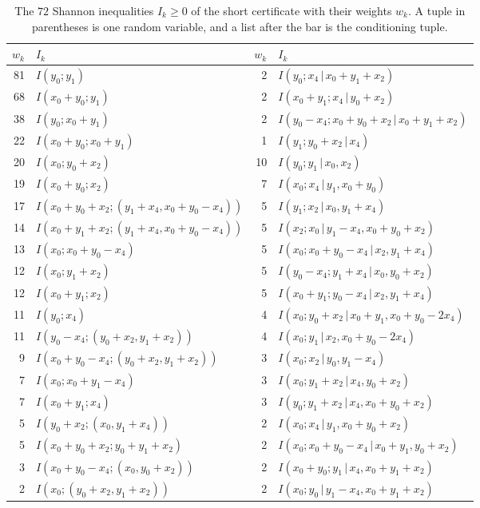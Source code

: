 \documentclass[11pt]{amsart}
\theoremstyle{definition}
\theoremstyle{remark}
\numberwithin{equation}{section}
\begin{document}
\begin{table}[p]
\centering
\caption{The $72$ Shannon inequalities $I_k\ge0$ of the short certificate with their weights $w_k$. A tuple in parentheses is one random variable, and a list after the bar is the conditioning tuple.}\label{tab:shortrows}
\small
\begin{tabular}{@{}rl@{\quad}rl@{}}
\toprule
$w_k$ & $I_k$ & $w_k$ & $I_k$\\
\midrule
81 & $I(y_0;y_1)$ & 2 & $I(y_0;x_4\,|\,x_0+y_1+x_2)$ \\
68 & $I(x_0+y_0;y_1)$ & 2 & $I(x_0+y_1;x_4\,|\,y_0+x_2)$ \\
38 & $I(y_0;x_0+y_1)$ & 2 & $I(y_0-x_4;x_0+y_0+x_2\,|\,x_0+y_1+x_2)$ \\
22 & $I(x_0+y_0;x_0+y_1)$ & 1 & $I(y_1;y_0+x_2\,|\,x_4)$ \\
20 & $I(x_0;y_0+x_2)$ & 10 & $I(y_0;y_1\,|\,x_0, x_2)$ \\
19 & $I(x_0+y_0;x_2)$ & 7 & $I(x_0;x_4\,|\,y_1, x_0+y_0)$ \\
17 & $I(x_0+y_0+x_2;(y_1+x_4, x_0+y_0-x_4))$ & 5 & $I(y_1;x_2\,|\,x_0, y_1+x_4)$ \\
14 & $I(x_0+y_1+x_2;(y_1+x_4, x_0+y_0-x_4))$ & 5 & $I(x_2;x_0\,|\,y_1-x_4, x_0+y_0+x_2)$ \\
13 & $I(x_0;x_0+y_0-x_4)$ & 5 & $I(x_0;x_0+y_0-x_4\,|\,x_2, y_1+x_4)$ \\
12 & $I(x_0;y_1+x_2)$ & 5 & $I(y_0-x_4;y_1+x_4\,|\,x_0, y_0+x_2)$ \\
12 & $I(x_0+y_1;x_2)$ & 5 & $I(x_0+y_1;y_0-x_4\,|\,x_2, y_1+x_4)$ \\
11 & $I(y_0;x_4)$ & 4 & $I(x_0;y_0+x_2\,|\,x_0+y_1, x_0+y_0-2x_4)$ \\
11 & $I(y_0-x_4;(y_0+x_2, y_1+x_2))$ & 4 & $I(x_0;y_1\,|\,x_2, x_0+y_0-2x_4)$ \\
9 & $I(x_0+y_0-x_4;(y_0+x_2, y_1+x_2))$ & 3 & $I(x_0;x_2\,|\,y_0, y_1-x_4)$ \\
7 & $I(x_0;x_0+y_1-x_4)$ & 3 & $I(x_0;y_1+x_2\,|\,x_4, y_0+x_2)$ \\
7 & $I(x_0+y_1;x_4)$ & 3 & $I(y_0;y_1+x_2\,|\,x_4, x_0+y_0+x_2)$ \\
5 & $I(y_0+x_2;(x_0, y_1+x_4))$ & 2 & $I(x_0;x_4\,|\,y_1, x_0+y_0+x_2)$ \\
5 & $I(x_0+y_0+x_2;y_0+y_1+x_2)$ & 2 & $I(x_0;x_0+y_0-x_4\,|\,x_0+y_1, y_0+x_2)$ \\
3 & $I(x_0+y_0-x_4;(x_0, y_0+x_2))$ & 2 & $I(x_0+y_0;y_1\,|\,x_4, x_0+y_1+x_2)$ \\
2 & $I(x_0;(y_0+x_2, y_1+x_2))$ & 2 & $I(x_0;y_0\,|\,y_1-x_4, x_0+y_1+x_2)$ \\

\end{tabular}
\end{table}
\end{document}
